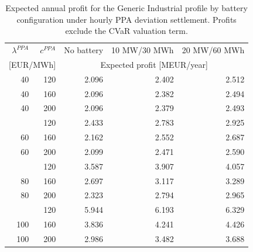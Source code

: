 \begin{table}[htbp]
\centering
\small
\caption{Expected annual profit for the Generic Industrial profile by battery configuration under hourly PPA deviation settlement. Profits exclude the CVaR valuation term.}
\label{tab:battery_expected_profit_generic_industrial}
\begin{tabular*}{\textwidth}{@{\extracolsep{\fill}}rrrrr@{}}
\toprule
$\lambda^{PPA}$ & $c^{PPA}$ & No battery & 10 MW/30 MWh & 20 MW/60 MWh \\
\multicolumn{2}{c}{[EUR/MWh]} & \multicolumn{3}{c}{Expected profit [MEUR/year]} \\
\midrule
40 & 120 & 2.096 & 2.402 & 2.512 \\
40 & 160 & 2.096 & 2.382 & 2.494 \\
40 & 200 & 2.096 & 2.379 & 2.493 \\
\addlinespace
60 & 120 & 2.433 & 2.783 & 2.925 \\
60 & 160 & 2.162 & 2.552 & 2.687 \\
60 & 200 & 2.099 & 2.471 & 2.590 \\
\addlinespace
80 & 120 & 3.587 & 3.907 & 4.057 \\
80 & 160 & 2.697 & 3.117 & 3.289 \\
80 & 200 & 2.323 & 2.794 & 2.965 \\
\addlinespace
100 & 120 & 5.944 & 6.193 & 6.329 \\
100 & 160 & 3.836 & 4.241 & 4.426 \\
100 & 200 & 2.986 & 3.482 & 3.688 \\
\bottomrule
\end{tabular*}
\end{table}
